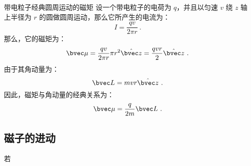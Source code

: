 \begin{example}{带电粒子经典圆周运动的磁矩}\label{ex_MagMom_1}
设一个带电粒子的电荷为 $q$，并且以匀速 $v$ 绕 $z$ 轴上半径为 $r$ 的圆做圆周运动，那么它所产生的电流为：
\begin{equation}
I=\frac{qv}{2\pi r}~.
\end{equation}
那么，它的磁矩为：
\begin{equation}
\bvec\mu  = \frac{qv}{2\pi r}\pi r^2 \hat{\bvec z}=\frac{qvr}{2} \hat{\bvec z} ~.
\end{equation}
由于其角动量为：
\begin{equation}
\bvec L =mvr\hat{\bvec z}~.
\end{equation}
因此，磁矩与角动量的经典关系为：
\begin{equation}
\bvec\mu  = \frac{q}{2m}\bvec L~.
\end{equation}

\end{example}


\subsection{磁子的进动}

若
